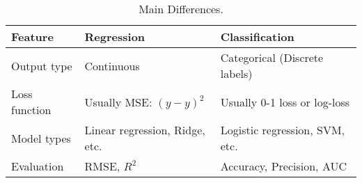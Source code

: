 \highspace
\begin{table}[!htp]
    \centering
    \begin{tabular}{@{} l l l @{}}
        \toprule
        Feature & Regression & Classification \\
        \midrule
        Output type     & Continuous                        & Categorical (Discrete labels)      \\ [.5em]
        Loss function   & Usually MSE: $(y - \hat{y})^2$    & Usually 0-1 loss or log-loss       \\ [.5em]
        Model types     & Linear regression, Ridge, etc.    & Logistic regression, SVM, etc.     \\ [.5em]
        Evaluation      & RMSE, $R^{2}$                     & Accuracy, Precision, AUC           \\
        \bottomrule
    \end{tabular}
    \caption{Main Differences.}
\end{table}
